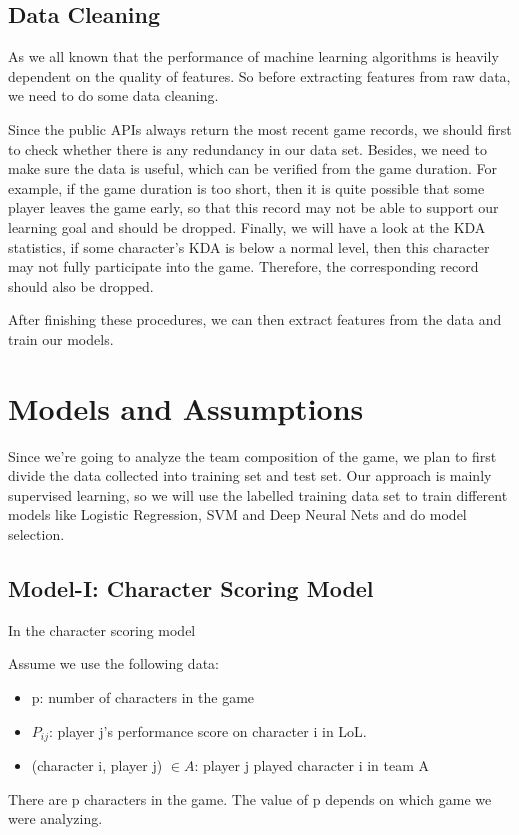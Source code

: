 \documentclass[conference]{IEEEtran}
\begin{document}
\subsection{Data Cleaning}

As we all known that the performance of machine learning algorithms is heavily dependent on the quality of features. So before extracting features from raw data, we need to do some data cleaning.

Since the public APIs always return the most recent game records, we should first to check whether there is any redundancy in our data set. Besides, we need to make sure the data is useful, which can be verified from the game duration. For example, if the game duration is too short, then it is quite possible that some player leaves the game early, so that this record may not be able to support our learning goal and should be dropped. Finally, we will have a look at the KDA statistics, if some character's KDA is below a normal level, then this character may not fully participate into the game. Therefore, the corresponding record should also be dropped.

After finishing these procedures, we can then extract features from the data and train our models.

\section{Models and Assumptions}

Since we're going to analyze the team composition of the game, we plan to first divide the data collected into training set and test set. Our approach is mainly supervised learning, so we will use the labelled training data set to train different models like Logistic Regression, SVM and Deep Neural Nets and do model selection.

\subsection{Model-I: Character Scoring Model}

In the character scoring model

Assume we use the following data:
\begin{itemize}
\item p: number of characters in the game
\item $P_{ij}$: player j's performance score on character i in LoL.
\item (character i, player j) $\in A$: player j played character i in team A

\end{itemize}
There are p characters in the game. The value of p depends on which game we were analyzing.
\end{document}
